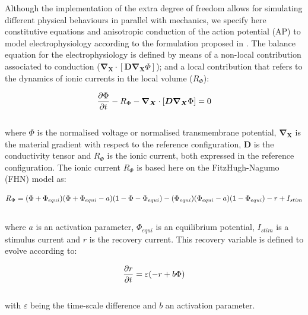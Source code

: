 \documentclass[oneside,11pt,times]{book}
\begin{document}
Although the implementation of the extra degree of freedom allows for simulating different physical behaviours in parallel with mechanics, we specify here constitutive equations and anisotropic conduction of the action potential (AP) to model electrophysiology according to the formulation proposed in \citep{garciajeru:2018}. The balance equation for the electrophysiology is defined by means of a non-local contribution associated to conduction ($\bm{\nabla_{X}}\cdot[\bm{D}\bm{\nabla_{X}}\Phi]$); and a local contribution that refers to the dynamics of ionic currents in the local volume ($R_{\Phi}$):

\begin{equation}
\begin{aligned}
\centering
\dfrac{\partial{\Phi}}{\partial{t}}-R_{\Phi} - \bm{\nabla_{X}}\cdot[\bm{D}\bm{\nabla_{X}}\Phi] = 0
\end{aligned}
\label{equationBalance}
\end{equation}
\\
where $\Phi$ is the normalised voltage or normalised transmembrane potential, $\bm{\nabla_{X}}$ is the material gradient with respect to the reference configuration, $\bm{D}$ is the conductivity tensor and $R_{\Phi}$ is the ionic current, both expressed in the reference configuration. The ionic current $R_{\Phi}$ is based here on the FitzHugh-Nagumo (FHN) model as:

\begin{equation}
\begin{aligned}
\centering
R_{\Phi}=(\Phi+\Phi_{equi})(\Phi+\Phi_{equi}-a)(1-\Phi-\Phi_{equi})-(\Phi_{equi})(\Phi_{equi}-a)(1-\Phi_{equi})-r+I_{stim}
\end{aligned}
\label{equationIonicCurrent}
\end{equation}
\\
where $a$ is an activation parameter, $\Phi_{equi}$ is an equilibrium potential, $I_{stim}$ is a stimulus current and $r$ is the recovery current. This recovery variable is defined to evolve according to:

\begin{equation}
\begin{aligned}
\centering
\dfrac{\partial{r}}{\partial{t}}=\varepsilon(-r+b\Phi)
\end{aligned}
\label{equationRecovery}
\end{equation}
\\
with $\varepsilon$ being the time-scale difference and $b$ an activation parameter.\\
\end{document}
